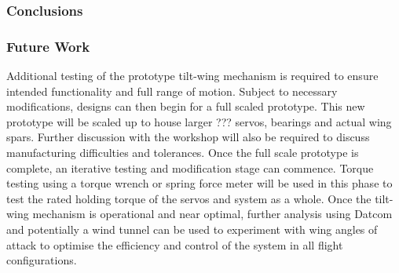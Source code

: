 \subsubsection{Conclusions}

\subsubsection{Future Work}
Additional testing of the prototype tilt-wing mechanism is required to ensure intended functionality and full range of motion. Subject to necessary modifications, designs can then begin for a full scaled prototype. This new prototype will be scaled up to house larger ??? servos, bearings and actual wing spars. Further discussion with the workshop will also be required to discuss manufacturing difficulties and tolerances. Once the full scale prototype is complete, an iterative testing and modification stage can commence. Torque testing using a torque wrench or spring force meter will be used in this phase to test the rated holding torque of the servos and system as a whole. Once the tilt-wing mechanism is operational and near optimal, further analysis using Datcom and potentially a wind tunnel can be used to experiment with wing angles of attack to optimise the efficiency and control of the system in all flight configurations. 